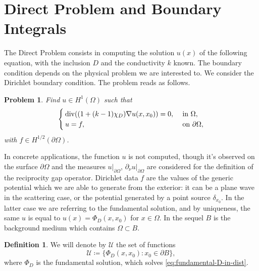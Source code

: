 \documentclass[10pt, a4paper, twoside, openright]{book}
\theoremstyle{definition}
\newtheorem{definition}[subsection]{Definition}
\theoremstyle{plain}
\theoremstyle{plain}
\theoremstyle{plain}
\theoremstyle{plain}
\theoremstyle{plain}
\theoremstyle{plain}
\theoremstyle{plain}
\theoremstyle{plain}
\newtheorem{problem}[subsection]{Problem}
\DeclareMathOperator{\divergence}{div}
\begin{document}
\section{Direct Problem and Boundary Integrals}
The Direct Problem consists in computing the solution $u(x)$ of the following equation, 
with the inclusion $D$ and the conductivity $k$ known. The boundary condition depends on 
the physical problem we are interested to. 
We consider the Dirichlet boundary condition. The problem reads as follows.
\begin{problem}
Find $u \in H^1(\Omega)$ such that
\begin{equation}
  \begin{cases}
  \divergence((1+(k-1)\chi_D)\nabla u(x,x_0)) = 0, & \textup{ in }\Omega,\\
  u = f, & \textup{ on } \partial\Omega,
 \end{cases}
\end{equation}
with $f\in H^{1/2}(\partial\Omega)$.
\end{problem}
In concrete applications, the function $u$ is not computed, though it's observed on the 
surface $\partial\Omega$ and the measures $u|_{\partial \Omega}$, 
$\partial_\nu u|_{\partial \Omega}$ are considered for the definition of the reciprocity gap operator. Dirichlet data $f$ are the values of the generic potential which we are able to generate from the exterior: it can be a plane wave in the scattering case, or the potential generated by a point source $\delta_{x_0}$. In the latter case we are referring to the fundamental solution, and by uniqueness, the same $u$ is equal to $u(x)=\Phi_D(x,x_0)$ for $x\in \Omega$.
In the sequel $B$ is the background medium which contains $\Omega\subset B$.
\begin{definition}
\label{def:setU}
We will denote by $\mathcal{U}$ the set of functions
\begin{equation}
 \mathcal{U}\coloneqq\bigl\{\Phi_D(x, x_0): x_0\in \partial B\bigr\},
\end{equation}
where $\Phi_D$ is the fundamental solution, which solves \eqref{eq:fundamental-D-in-dist}.
\end{definition}
\end{document}
